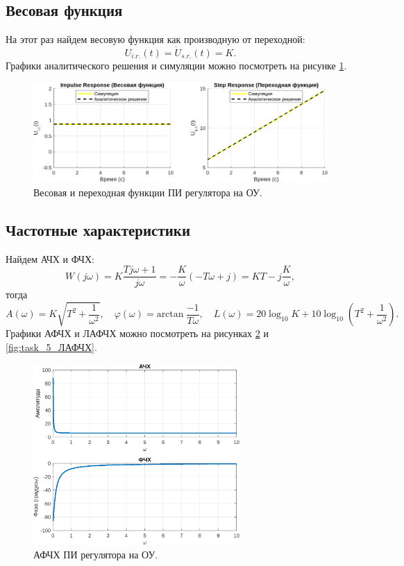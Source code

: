 \subsection{Весовая функция}

На этот раз найдем весовую функция как производную от переходной:
\begin{equation*}
    U_{i.r.}(t)=\dot U_{s.r.}(t)=K.
\end{equation*}
Графики аналитического решения и симуляции можно посмотреть на рисунке \ref{fig:task_5_impl_step}.

\begin{figure}[htbp]
    \centering
    \includegraphics[width=1\textwidth]{figs/task_5_impl_step.png}
    \caption{Весовая и переходная функции ПИ регулятора на ОУ.}
    \label{fig:task_5_impl_step}
\end{figure}

\subsection{Частотные характеристики}

Найдем АЧХ и ФЧХ:
\begin{equation*}
    W(j\omega)=K\frac{Tj\omega + 1}{j\omega}=-\frac{K}{\omega}(-T\omega+j)=KT-j\frac{K}{\omega},
\end{equation*}
тогда
\begin{equation*}
    A(\omega)=K\sqrt{T^2+\frac{1}{\omega^2}},\quad \varphi(\omega)=\text{arctan}\ \frac{-1}{T\omega}, \quad L(\omega)=20\log_{10}K+10\log_{10}\left(T^2+\frac{1}{\omega^2}\right).
\end{equation*}
Графики АФЧХ и ЛАФЧХ можно посмотреть на рисунках \ref{fig:task_5_АФЧХ} и \ref{fig:task_5_ЛАФЧХ}.

\begin{figure}[H]
    \centering
    \includegraphics[width=0.7\textwidth]{figs/task_5_АФЧХ.png}
    \caption{АФЧХ ПИ регулятора на ОУ.}
    \label{fig:task_5_АФЧХ}
\end{figure}

